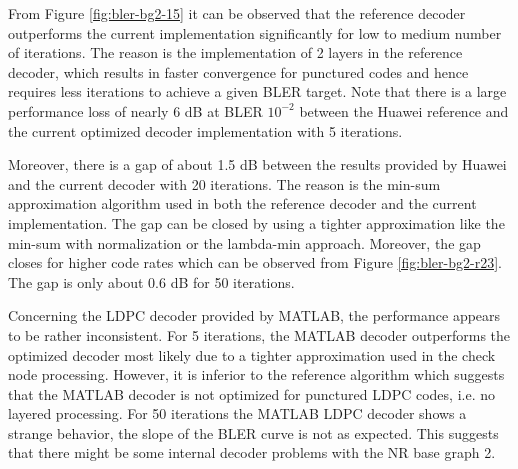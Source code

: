 \documentclass{article}
\begin{document}
From Figure \ref{fig:bler-bg2-15} it can be observed that the reference decoder outperforms the current implementation significantly for low to medium number of iterations. The reason is the implementation of 2 layers in the reference decoder, which results in faster convergence for punctured codes and hence requires less iterations to achieve a given BLER target. Note that there is a large performance loss of nearly 6 dB at BLER $10^{-2}$ between the Huawei reference and the current optimized decoder implementation with 5 iterations.

Moreover, there is a gap of about 1.5 dB between the results provided by Huawei and the current decoder with 20 iterations. The reason is the min-sum approximation algorithm used in both the reference decoder and the current implementation. The gap can be closed by using a tighter approximation like the min-sum with normalization or the lambda-min approach. Moreover, the gap closes for higher code rates which can be observed from Figure \ref{fig:bler-bg2-r23}. The gap is only about 0.6 dB for 50 iterations.

Concerning the LDPC decoder provided by MATLAB, the performance appears to be rather inconsistent. For 5 iterations, the MATLAB decoder outperforms the optimized decoder most likely due to a tighter approximation used in the check node processing. However, it is inferior to the reference algorithm which suggests that the MATLAB decoder is not optimized for punctured LDPC codes, i.e. no layered processing. For 50 iterations the MATLAB LDPC decoder shows a strange behavior, the slope of the BLER curve is not as expected. This suggests that there might be some internal decoder problems with the NR base graph 2.
\end{document}
